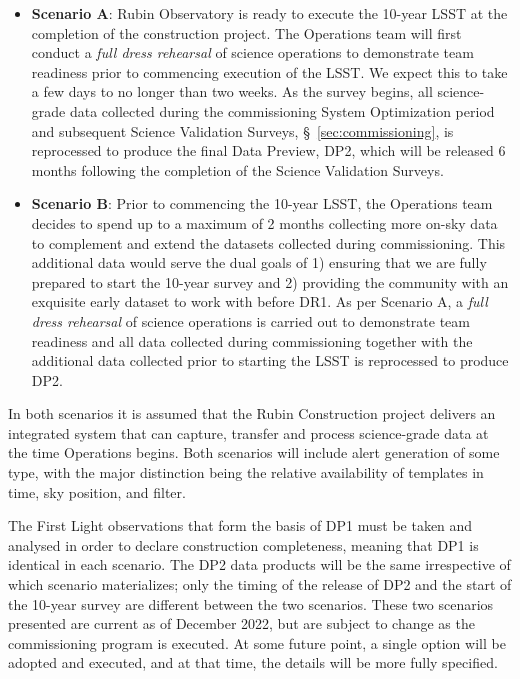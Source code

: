 \begin{itemize}
\item \textbf{Scenario A}:
Rubin Observatory is ready to execute the 10-year LSST at the completion of the construction project. 
The Operations team will first conduct a \textit{full dress rehearsal} of science operations to demonstrate team readiness prior to commencing execution of the LSST.
We expect this to take a few days to no longer than two weeks. 
As the survey begins, all science-grade data collected during the commissioning System Optimization period and subsequent Science Validation Surveys, \S~\ref{sec:commissioning}, is reprocessed to produce the final Data Preview, DP2, which will be released 6 months following the completion of the Science Validation Surveys.

\item \textbf{Scenario B}:
Prior to commencing the 10-year LSST, the Operations team decides to spend up to a maximum of 2 months collecting more on-sky data to complement and extend the datasets collected during commissioning. 
This additional data would serve the dual goals of 1) ensuring that we are fully prepared to start the 10-year survey and 2) providing the community with an exquisite early dataset to work with before DR1. 
As per Scenario A, a \textit{full dress rehearsal} of science operations is carried out to demonstrate team readiness and all data collected during commissioning together with the additional data collected prior to starting the LSST is reprocessed to produce DP2.
\end{itemize}

In both scenarios it is assumed that the Rubin Construction project delivers an integrated system that can capture, transfer and process science-grade data at the time Operations begins.
Both scenarios will include alert generation of some type, with the major distinction being the relative availability of templates in time, sky position, and filter.

The First Light observations that form the basis of DP1 must be taken and analysed in order to declare construction completeness, meaning that DP1 is identical in each scenario.
The DP2 data products will be the same irrespective of which scenario materializes; only the timing of the release of DP2 and the start of the 10-year survey are different between the two scenarios.
These two scenarios presented are current as of December 2022, but are subject to change as the commissioning program is executed.
At some future point, a single option will be adopted and executed, and at that time, the details will be more fully specified.

